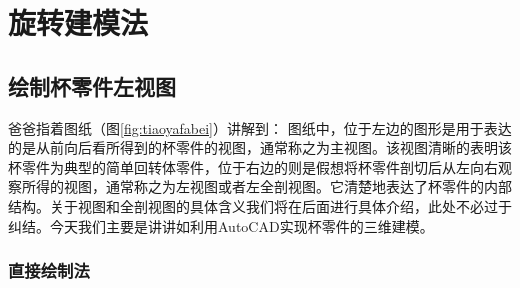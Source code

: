 \section{旋转建模法}
\subsection{绘制杯零件左视图}\label{sec:beilingjianleft}
爸爸指着图纸（图\ref{fig:tiaoyafabei}）讲解到：
图纸中，位于左边的图形是用于表达的是从前向后看所得到的杯零件的视图，通常称之为主视图。该视图清晰的表明该杯零件为典型的简单回转体零件，位于右边的则是假想将杯零件剖切后从左向右观察所得的视图，通常称之为左视图或者左全剖视图。它清楚地表达了杯零件的内部结构。关于视图和全剖视图的具体含义我们将在后面进行具体介绍，此处不必过于纠结。今天我们主要是讲讲如利用AutoCAD实现杯零件的三维建模。
\subsubsection{直接绘制法}
